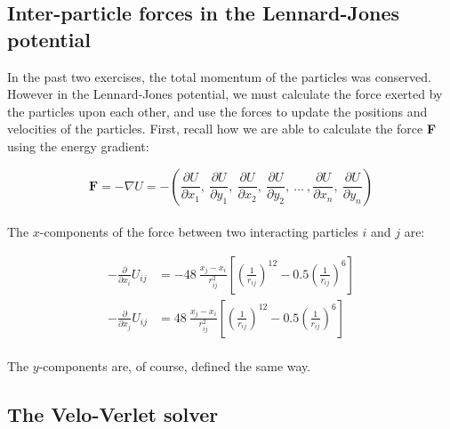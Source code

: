 \documentclass{article}
\begin{document}
% 

\subsection{Inter-particle forces in the Lennard-Jones potential}

In the past two exercises, the total momentum of the particles was conserved.
However in the Lennard-Jones potential, we must calculate the force exerted by the particles upon each other, and use the forces to update the positions and velocities of the particles.
First, recall how we are able to calculate the force \textbf{F} using the energy gradient:

\begin{equation}
    \mathbf{F} = -\nabla U = -\left( \frac{\partial U}{\partial x_1},\ \frac{\partial U}{\partial y_1},\  \frac{\partial U}{\partial x_2},\ \frac{\partial U}{\partial y_2},\ \ldots\ ,\frac{\partial U}{\partial x_n},\ \frac{\partial U}{\partial y_n}\right)
    \label{eq:force}
\end{equation}\\

The $x$-components of the force between two interacting particles $i$ and $j$ are:

\begin{align}
    -\frac{\partial}{\partial x_i} U_{ij} &= -48\ \frac{x_j - x_i}{r^2_{ij}}\left[ \left(\frac{1}{r_{ij}} \right)^{12} - 0.5 \left(\frac{1}{r_{ij}} \right)^6 \right] \\
    -\frac{\partial}{\partial x_j} U_{ij} &=  48\ \frac{x_j - x_i}{r^2_{ij}}\left[ \left(\frac{1}{r_{ij}} \right)^{12} - 0.5 \left(\frac{1}{r_{ij}} \right)^6 \right]
\end{align}\\

The $y$-components are, of course, defined the same way.

\subsection{The Velo-Verlet solver}
\end{document}
